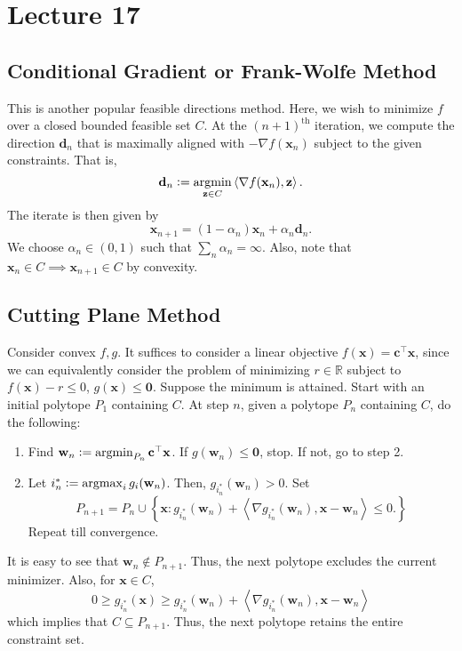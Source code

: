 \section{Lecture 17}

\subsection*{Conditional Gradient or Frank-Wolfe Method}

This is another popular feasible directions method. Here, we wish to minimize $f$ over a closed bounded feasible set $C$. At the $(n+1)^{\text{th}}$ iteration, we compute the direction $\mathbf{d}_n$ that is maximally aligned with $-\nabla f(\mathbf{x}_n)$ subject to the given constraints. That is,
\[
    \mathbf{d}_n \vcentcolon= \operatorname*{argmin}_{\mathbf{z} \in C} \left\langle \nabla f(\mathbf{x}_n), \mathbf{z} \right\rangle.
\]  
The iterate is then given by
\[
    \mathbf{x}_{n+1} = (1-\alpha_n) \mathbf{x}_n + \alpha_n \mathbf{d}_n. 
\]
We choose $\alpha_n \in (0,1)$ such that $\sum_n \alpha_n = \infty$. Also, note that $\mathbf{x}_n \in C \implies \mathbf{x}_{n+1} \in C$ by convexity. 

\subsection*{Cutting Plane Method}

Consider convex $f,g$. It suffices to consider a linear objective $f(\mathbf{x}) = \mathbf{c}^{\top}\mathbf{x}$, since we can equivalently consider the problem of minimizing $r \in \mathbb{R}$ subject to $f(\mathbf{x}) - r \leq 0$, $g(\mathbf{x}) \leq \mathbf{0}$. Suppose the minimum is attained. Start with an initial polytope $P_1$ containing $C$. At step $n$, given a polytope $P_n$ containing $C$, do the following:
\begin{enumerate}
    \item Find $\mathbf{w}_n \vcentcolon= \operatorname*{argmin}_{P_n} \mathbf{c}^{\top} \mathbf{x}$. If $g(\mathbf{w}_n) \leq \mathbf{0}$, stop. If not, go to step 2.
    \item Let $i^*_n \vcentcolon= \operatorname*{argmax}_i g_i(\mathbf{w}_n)$. Then, $g_{i^*_n}(\mathbf{w}_n) > 0$. Set
    \[
        P_{n+1} = P_n \cup \left\{ \mathbf{x} \colon g_{i^*_n}(\mathbf{w}_n) + \left\langle \nabla g_{i^*_n}(\mathbf{w}_n), \mathbf{x} - \mathbf{w}_n \right\rangle \leq 0. \right\}
    \]
    Repeat till convergence. 
\end{enumerate}

It is easy to see that $\mathbf{w}_n \notin P_{n+1}$. Thus, the next polytope excludes the current minimizer. Also, for $\mathbf{x} \in C$, 
\[
    0 \geq g_{i^*_n}(\mathbf{x}) \geq g_{i^*_n}(\mathbf{w}_n) + \left\langle \nabla g_{i^*_n}(\mathbf{w}_n), \mathbf{x} - \mathbf{w}_n \right\rangle
\]
which implies that $C \subseteq P_{n+1}$. Thus, the next polytope retains the entire constraint set. 

